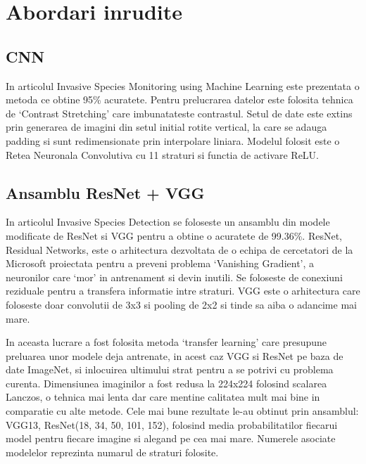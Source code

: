 \documentclass{article}
\begin{document}
\section{Abordari inrudite}

\subsection{CNN}
In articolul Invasive Species Monitoring using Machine Learning\cite{WEBSITE:4} este prezentata o metoda ce obtine 95\% acuratete.  Pentru prelucrarea datelor este folosita tehnica de ‘Contrast Stretching’ care imbunatateste contrastul. Setul de date este extins prin generarea de imagini din setul initial rotite vertical, la care se adauga padding si sunt redimensionate prin interpolare liniara. Modelul folosit este o Retea Neuronala Convolutiva cu 11 straturi si functia de activare ReLU.

\subsection{Ansamblu ResNet + VGG}
In articolul Invasive Species Detection\cite{ARTICLE:1} se foloseste un ansamblu din modele modificate de ResNet si VGG pentru a obtine o acuratete de 99.36\%. ResNet, Residual Networks, este o arhitectura dezvoltata de o echipa de cercetatori de la Microsoft proiectata pentru a preveni problema ‘Vanishing Gradient’, a neuronilor care ‘mor’ in antrenament si devin inutili. Se foloseste de conexiuni reziduale pentru a transfera informatie intre straturi\cite{ARTICLE:2}. VGG este o arhitectura care foloseste doar convolutii de 3x3 si pooling de 2x2 si tinde sa aiba o adancime mai mare\cite{ARTICLE:3}.
 
In aceasta lucrare a fost folosita metoda ‘transfer learning’ care presupune preluarea unor modele deja antrenate, in acest caz VGG si ResNet pe baza de date ImageNet, si inlocuirea ultimului strat pentru a se potrivi cu problema curenta. Dimensiunea imaginilor a fost redusa la 224x224 folosind scalarea Lanczos, o tehnica mai lenta dar care mentine calitatea mult mai bine in comparatie cu alte metode. Cele mai bune rezultate le-au obtinut prin ansamblul: VGG13, ResNet(18, 34, 50, 101, 152), folosind media probabilitatilor fiecarui model pentru fiecare imagine si alegand pe cea mai mare. Numerele asociate modelelor reprezinta numarul de straturi folosite.
\end{document}
